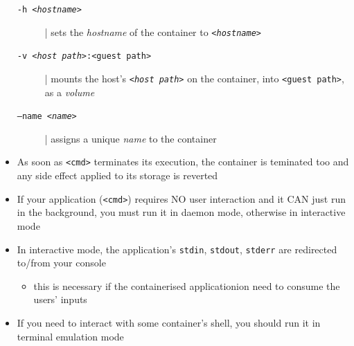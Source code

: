 \documentclass[presentation]{beamer}\mode<presentation>{\usetheme{AMSBolognaFC}}
\begin{document}
\begin{frame}[allowframebreaks]
\begin{itemize}
\begin{description}
        \item[\texttt{-h \textit{<hostname>}}]  |  sets the \emph{\alert{h}ostname} of the container to \texttt{\textit{<hostname>}}

        \item[\texttt{-v \textit{<host path>}:<guest path>}]  |  mounts the host's \texttt{\textit{<host path>}} on the container, into \texttt{<guest path>}, as a \emph{\alert{v}olume}

        \item[\texttt{--name \textit{<name>}}]  |  assigns a unique \emph{\alert{n}ame} to the container
    \end{description}

    \framebreak

    \item As soon as \texttt{<cmd>} terminates its execution, the container is teminated too and any side effect applied to its storage is reverted

    \medskip

    \item If your application (\texttt{<cmd>}) requires NO user interaction and it CAN just run in the background, you must run it in daemon mode, otherwise in interactive mode

    \medskip

    \item In interactive mode, the application's \texttt{stdin}, \texttt{stdout}, \texttt{stderr} are redirected to/from your console
    \begin{itemize}
        \item this is necessary if the containerised applicationion need to consume the users' inputs
    \end{itemize}

    \medskip

    \item If you need to interact with some container's shell, you should run it in terminal emulation mode
\end{itemize}

\end{frame}
\end{document}
